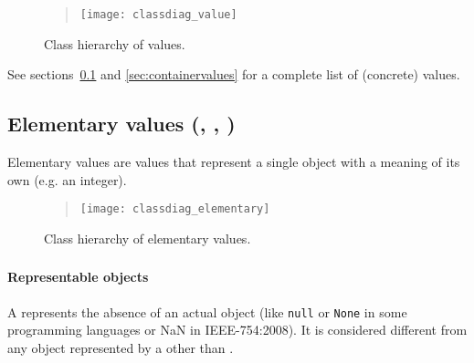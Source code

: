 \begin{figure}[H]
    \begin{quote}
        \noindent
        \texttt{[image: classdiag\_value]}%
        \caption{Class hierarchy of values.}
        \label{fig:class:Value}
    \end{quote}
\end{figure}

See sections~\ref{sec:elementaryvalues} and \ref{sec:containervalues} for a complete list of (concrete) values.


\subsection{Elementary values (\DborElementaryValue, \DborNumberValue, \DborStringValue)}
\label{sec:elementaryvalues}
\hypertarget{sec:def:ElementaryValue}{}
\hypertarget{sec:def:NumberValue}{}
\hypertarget{sec:def:StringValue}{}

Elementary values are values that represent a single object with a meaning of its own (e.g. an integer).


\begin{figure}[H]
    \begin{quote}
        \noindent
        \texttt{[image: classdiag\_elementary]}%
        \caption{Class hierarchy of elementary values.}
        \label{fig:class:ElementaryValue}
    \end{quote}
\end{figure}


\subsubsection{\DborNoneValue}
\label{sec:def:NoneValue}
\hypertarget{sec:def:NoneValue}{}

\paragraph{Representable objects}

A \DborNoneValue{} represents the absence of an actual object (like \texttt{null} or \texttt{None} in some
programming languages or NaN in IEEE-754:2008).
It is considered different from any object represented by a \DborValue*{} other than \DborNoneValue.

